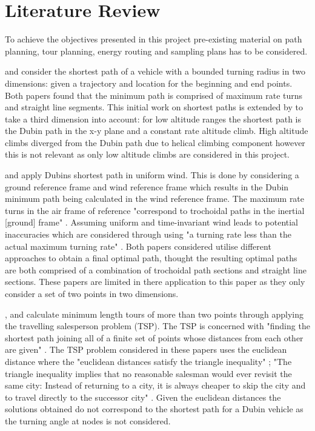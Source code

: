 \section{Literature Review}
To achieve the objectives presented in this project pre-existing material on path planning, tour planning, energy routing and sampling plans has to be considered.

\cite{Dubins1957} and \cite{Boissonnat1993} consider the shortest path of a vehicle with a bounded turning radius in two dimensions: given a trajectory and location for the beginning and end points. Both papers found that the minimum path is comprised of maximum rate turns and straight line segments. This initial work on shortest paths is extended by \cite{Chitsaz2007} to take a third dimension into account: for low altitude ranges the shortest path is the Dubin path in the x-y plane and a constant rate altitude climb. High altitude climbs diverged from the Dubin path due to helical climbing component however this is not relevant as only low altitude climbs are considered in this project.

\cite{McGee2005} and \cite{Techy2009} apply Dubins shortest path in uniform wind. This is done by considering a ground reference frame and wind reference frame which results in the Dubin minimum path being calculated in the wind reference frame. The maximum rate turns in the air frame of reference "correspond to trochoidal paths in the inertial [ground] frame" \cite{Techy2009}. Assuming uniform and time-invariant wind leads to potential inaccuracies which are considered through using "a turning rate less than the actual maximum turning rate" \cite{McGee2005}. Both papers considered utilise different approaches to obtain a final optimal path, thought the resulting optimal paths are both comprised of a combination of trochoidal path sections and straight line sections. These papers are limited in there application to this paper as they only consider a set of two points in two dimensions.

\cite{Bigg1976}, \cite{Held1984} and \cite{DeBerg2010} calculate minimum length tours of more than two points through applying the travelling salesperson problem (TSP). The TSP is concerned with "finding the shortest path joining all of a finite set of points whose distances from each other are given" \cite{Held1984}. The TSP problem considered in these papers uses the euclidean distance where the "euclidean distances satisfy the triangle inequality" \cite{DeBerg2010}; "The triangle inequality implies that no reasonable salesman would ever revisit the same city: Instead of returning to a city, it is always cheaper to skip the city and to travel directly to the successor city" \cite{DeBerg2010}. Given the euclidean distances the solutions obtained do not correspond to the shortest path for a Dubin vehicle as the turning angle at nodes is not considered.

